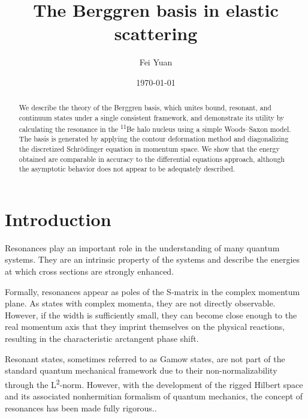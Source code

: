 \documentclass[amsmath, amssymb, aps, floatfix, nofootinbib, preprintnumbers,
  showpacs, superscriptaddress, twocolumn]{revtex4-1}
\begin{document}
\title{The Berggren basis in elastic scattering}
\date{\today}

\author{Fei Yuan}

\begin{abstract}
  We describe the theory of the Berggren basis, which unites bound, resonant,
  and continuum states under a single consistent framework, and demonstrate
  its utility by calculating the resonance in the \textsuperscript{11}Be halo
  nucleus using a simple Woods--Saxon model.  The basis is generated by
  applying the contour deformation method and diagonalizing the discretized
  Schr\"odinger equation in momentum space.  We show that the energy obtained
  are comparable in accuracy to the differential equations approach, although
  the asymptotic behavior does not appear to be adequately described.
\end{abstract}
\maketitle

\newcommand{\D}{\operatorname{d \!}\mathord{}}
\newcommand{\E}{\mathrm e}
\newcommand{\I}{\mathrm{i}}
\newcommand{\PI}{\pi}

\section{Introduction}

Resonances play an important role in the understanding of many quantum
systems.  They are an intrinsic property of the systems and describe the
energies at which cross sections are strongly enhanced.\cite{Michel2009}

Formally, resonances appear as poles of the S-matrix in the complex momentum
plane.\cite{Newton1966} As states with complex momenta, they are not directly
observable.  However, if the width is sufficiently small, they can become
close enough to the real momentum axis that they imprint themselves on the
physical reactions, resulting in the characteristic arctangent phase shift.

Resonant states, sometimes referred to as Gamow states, are not part of the
standard quantum mechanical framework due to their non-normalizability through
the L\textsuperscript{2}-norm.  However, with the development of the rigged
Hilbert space and its associated nonhermitian formalism of quantum mechanics,
the concept of resonances has been made fully rigorous.\cite{Bohm1978}.
\end{document}
